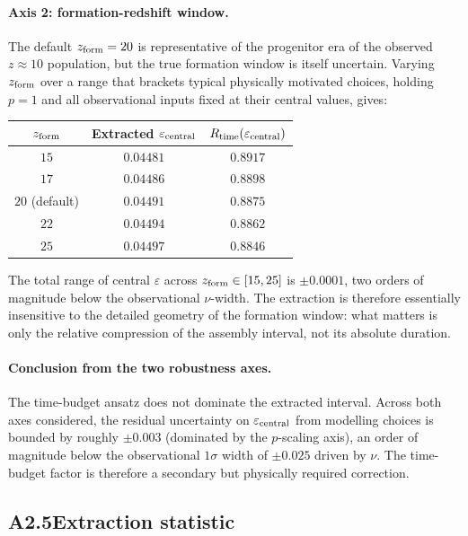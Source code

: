 \paragraph{Axis 2: formation-redshift window.}
The default $z_{\rm form} = 20$ is representative of the
progenitor era of the observed $z \approx 10$ population, but the
true formation window is itself uncertain. Varying
$z_{\rm form}$ over a range that brackets typical physically
motivated choices, holding $p = 1$ and all observational inputs
fixed at their central values, gives:
\begin{center}
\begin{tabular}{|c|c|c|}
\hline
$z_{\rm form}$ & Extracted $\varepsilon_{\rm central}$ &
$R_{\rm time}(\varepsilon_{\rm central})$ \\
\hline
$15$ & $0.04481$ & $0.8917$ \\
$17$ & $0.04486$ & $0.8898$ \\
$20$ (default) & $0.04491$ & $0.8875$ \\
$22$ & $0.04494$ & $0.8862$ \\
$25$ & $0.04497$ & $0.8846$ \\
\hline
\end{tabular}
\end{center}
The total range of central $\varepsilon$ across
$z_{\rm form} \in [15, 25]$ is $\pm 0.0001$, two orders of
magnitude below the observational $\nu$-width. The extraction is
therefore essentially insensitive to the detailed geometry of the
formation window: what matters is only the relative compression
of the assembly interval, not its absolute duration.

\paragraph{Conclusion from the two robustness axes.}
The time-budget ansatz does not dominate the extracted interval.
Across both axes considered, the residual uncertainty on
$\varepsilon_{\rm central}$ from modelling choices is bounded by
roughly $\pm 0.003$ (dominated by the $p$-scaling axis), an order
of magnitude below the observational $1\sigma$ width of
$\pm 0.025$ driven by $\nu$. The time-budget factor is therefore
a secondary but physically required correction.


\subsection*{A2.5\quad Extraction statistic}

